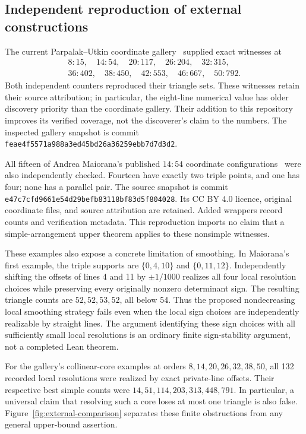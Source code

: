 \subsection{Independent reproduction of external constructions}

The current Parpalak--Utkin coordinate gallery~\cite{parpalakutkin2026} supplied
exact witnesses at
\[
\begin{gathered}
8:15,\quad14:54,\quad20:117,\quad26:204,\quad32:315,\\
36:402,\quad38:450,\quad42:553,\quad46:667,\quad50:792.
\end{gathered}
\]
Both independent counters reproduced their triangle sets. These witnesses
retain their source attribution; in particular, the eight-line numerical
value has older discovery priority than the coordinate gallery. Their addition
to this repository improves its verified coverage, not the discoverer's
claim to the numbers. The inspected gallery snapshot is commit
\texttt{feae4f5571a988a3ed45bd26a36259ebb7d7d3d2}.

All fifteen of Andrea Maiorana's published $14:54$ coordinate
configurations~\cite{maiorana2026} were also independently checked. Fourteen
have exactly two triple points, and one has four; none has a parallel pair.
The source snapshot is commit
\texttt{e47c7cfd9661e54d29befb83118bf83d5f804028}. Its CC BY 4.0 licence,
original coordinate files, and source attribution are retained. Added wrappers
record counts and verification metadata. This reproduction imports no claim
that a simple-arrangement upper theorem applies to these nonsimple witnesses.

These examples also expose a concrete limitation of smoothing. In Maiorana's
first example, the triple supports are $\{0,4,10\}$ and $\{0,11,12\}$.
Independently shifting the offsets of lines 4 and 11 by $\pm1/1000$ realizes all
four local resolution choices while preserving every originally nonzero
determinant sign. The resulting triangle counts are $52,52,53,52$, all below
54. Thus the proposed nondecreasing local smoothing strategy fails even when
the local sign choices are independently realizable by straight lines. The
argument identifying these sign choices with all sufficiently small local
resolutions is an ordinary finite sign-stability argument, not a completed
Lean theorem.

For the gallery's collinear-core examples at orders
$8,14,20,26,32,38,50$, all 132 recorded local resolutions were realized by
exact private-line offsets. Their respective best simple counts were
$14,51,114,203,313,448,791$. In particular, a universal claim that resolving
such a core loses at most one triangle is also false. Figure~\ref{fig:external-comparison}
separates these finite obstructions from any general upper-bound assertion.

